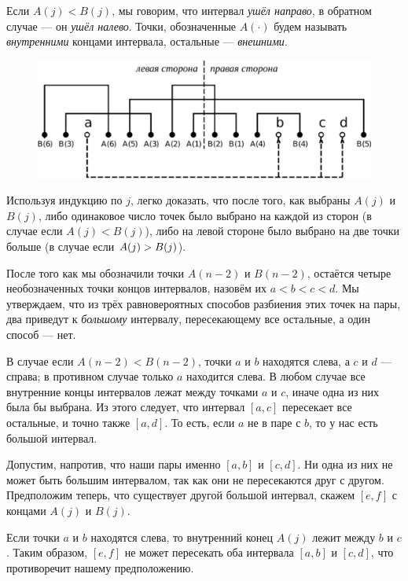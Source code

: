 Если $A(j) < B(j)$, мы говорим, что интервал \emph{ушёл направо}, в обратном случае --- он \emph{ушёл налево}.
Точки, обозначенные $A({\cdot})$ будем называть \emph{внутренними} концами интервала, остальные --- \emph{внешними}.

\begin{figure}[h!]
\centering
\includegraphics[scale=0.55]{Figs/Probability/labeling-ru}
\end{figure} 

Используя индукцию по $j$, легко доказать, что после того, как выбраны $A(j)$ и $B(j)$, либо одинаковое число точек было выбрано на каждой из сторон (в случае если $A(j) < B(j)$), либо на левой стороне было выбрано на две точки больше (в случае если $A(j) \z> B(j)$).

После того как мы обозначили точки $A(n-2)$ и $B(n-2)$, остаётся четыре необозначенных точки концов интервалов, назовём их $a<b<c<d$.
Мы утверждаем, что из трёх равновероятных способов разбиения этих точек на пары, два приведут к \emph{большому} интервалу, пересекающему все остальные, а один способ --- нет.

В случае если $A(n-2) < B(n-2)$, точки $a$ и $b$ находятся слева, а $c$ и $d$ --- справа;
в противном случае только $a$ находится слева.
В любом случае все внутренние концы интервалов лежат между точками $a$ и $c$, иначе одна из них была бы выбрана.
Из этого следует, что интервал $[a,c]$ пересекает все остальные, и точно также $[a,d]$.
То есть, если $a$ не в паре с $b$, то у нас есть большой интервал.

Допустим, напротив, что наши пары именно $[a, b]$ и $[c, d]$.
Ни одна из них не может быть большим интервалом, так как они не пересекаются друг с другом.
Предположим теперь, что существует другой большой интервал, скажем $[e,f]$ с концами $A(j)$ и $B(j)$.

Если точки $a$ и $b$ находятся слева, то внутренний конец $A(j)$ лежит между $b$ и $c$.
Таким образом, $[e, f]$ не может пересекать оба интервала $[a, b]$ и $[c, d]$, что противоречит нашему предположению.


